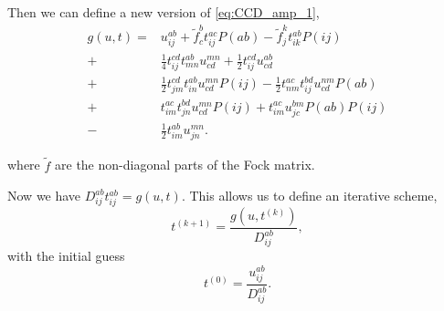 \documentclass[
    a4paper, aps, twocolumn, floatfix, superscriptaddress,
    nofootinbib]{revtex4-1}
\newcommand{\1}{\mathds{1}}
\begin{document}
        Then we can define a new version of \autoref{eq:CCD_amp_1},
        \begin{equation}
        \begin{aligned}
            g(u, t) =&
                    u^{ab}_{ij} + \tilde{f}^b_c t^{ac}_{ij}P(ab) - \tilde{f}^k_jt^{ab}_{ik}P(ij) \\
                 +& \frac{1}{4}t^{cd}_{ij} t^{ab}_{mn} u^{mn}_{cd} + \frac{1}{2}t^{cd}_{ij} u^{ab}_{cd} \\
                 +& \frac{1}{2}t^{cd}_{jm} t^{ab}_{in} u^{mn}_{cd} P(ij) - \frac{1}{2}t^{ac}_{nm} t^{bd}_{ij} u^{nm}_{cd} P(ab) \\
                 +& t^{ac}_{im} t^{bd}_{jn} u^{mn}_{cd} P(ij) + t^{ac}_{im} u^{bm}_{jc} P(ab) P(ij) \\
                 -& \frac{1}{2}t^{ab}_{im} u^{mn}_{jn}.
        \end{aligned}
        \end{equation}

        where $\tilde{f}$ are the non-diagonal parts of the Fock matrix.

        Now we have $D_{ij}^{ab}t_{ij}^{ab} = g(u, t)$.
        This allows us to define an iterative scheme,
        \begin{equation}
            t^{(k + 1)} = \frac{g(u, t^{(k)})}{D_{ij}^{ab}},
            \label{eq:iterative_amplitude}
        \end{equation}
        with the initial guess
        \begin{equation}
            t^{(0)} = \frac{u_{ij}^{ab}}{D_{ij}^{ab}}.
        \end{equation}
\end{document}
